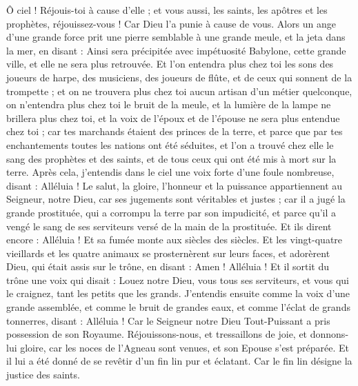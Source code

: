 \begin{multicols}{2}
Ô ciel ! Réjouis-toi à cause d'elle ; et vous aussi, les saints, les apôtres et les prophètes, réjouissez-vous ! Car Dieu l'a punie à cause de vous.
Alors un ange d'une grande force prit une pierre semblable à une grande meule, et la jeta dans la mer, en disant : Ainsi sera précipitée avec impétuosité Babylone, cette grande ville, et elle ne sera plus retrouvée.
Et l'on entendra plus chez toi les sons des joueurs de harpe, des musiciens, des joueurs de flûte, et de ceux qui sonnent de la trompette ; et on ne trouvera plus chez toi aucun artisan d'un métier quelconque, on n'entendra plus chez toi le bruit de la meule,
et la lumière de la lampe ne brillera plus chez toi, et la voix de l'époux et de l'épouse ne sera plus entendue chez toi ; car tes marchands étaient des princes de la terre, et parce que par tes enchantements toutes les nations ont été séduites,
et l'on a trouvé chez elle le sang des prophètes et des saints, et de tous ceux qui ont été mis à mort sur la terre.
\VerseOne{}Après cela, j'entendis dans le ciel une voix forte d'une foule nombreuse, disant : Alléluia ! Le salut, la gloire, l'honneur et la puissance appartiennent au Seigneur, notre Dieu,
car ses jugements sont véritables et justes ; car il a jugé la grande prostituée, qui a corrompu la terre par son impudicité, et parce qu'il a vengé le sang de ses serviteurs versé de la main de la prostituée.
Et ils dirent encore : Alléluia ! Et sa fumée monte aux siècles des siècles.
Et les vingt-quatre vieillards et les quatre animaux se prosternèrent sur leurs faces, et adorèrent Dieu, qui était assis sur le trône, en disant : Amen ! Alléluia !
Et il sortit du trône une voix qui disait : Louez notre Dieu, vous tous ses serviteurs, et vous qui le craignez, tant les petits que les grands.
J'entendis ensuite comme la voix d'une grande assemblée, et comme le bruit de grandes eaux, et comme l'éclat de grands tonnerres, disant : Alléluia ! Car le Seigneur notre Dieu Tout-Puissant a pris possession de son Royaume.
Réjouissons-nous, et tressaillons de joie, et donnons-lui gloire, car les noces de l'Agneau sont venues, et son Epouse s'est préparée.
Et il lui a été donné de se revêtir d'un fin lin pur et éclatant. Car le fin lin désigne la justice des saints.

\end{multicols}
